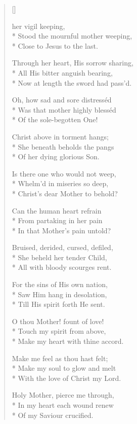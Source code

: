 \newHymn
{}

\begin{verse}[\versewidth]

 her vigil keeping,\\*
Stood the mournful mother weeping,\\*
Close to Jesus to the last.
\pointorig

Through her heart, His sorrow sharing,\\*
All His bitter anguish bearing,\\*
Now at length the sword had pass'd.

Oh, how sad and sore distresséd\\*
Was that mother highly blesséd\\*
Of the sole-begotten One!

Christ above in torment hangs;\\*
She beneath beholds the pangs\\*
Of her dying glorious Son.

Is there one who would not weep,\\*
Whelm'd in miseries so deep,\\*
Christ's dear Mother to behold?

Can the human heart refrain\\*
From partaking in her pain\\*
In that Mother's pain untold?

Bruised, derided, cursed, defiled,\\*
She beheld her tender Child,\\*
All with bloody scourges rent.

For the sins of His own nation,\\*
Saw Him hang in desolation,\\*
Till His spirit forth He sent.

O thou Mother! fount of love!\\*
Touch my spirit from above,\\*
Make my heart with thine accord.

Make me feel as thou hast felt;\\*
Make my soul to glow and melt\\*
With the love of Christ my Lord.

Holy Mother, pierce me through,\\*
In my heart each wound renew\\*
Of my Saviour crucified.


\end{verse}
